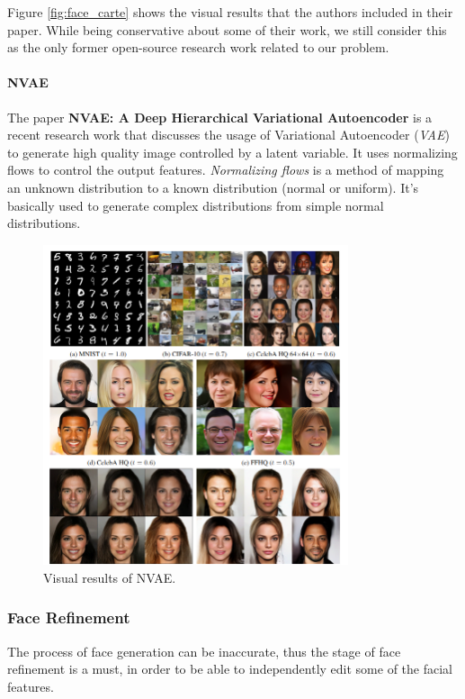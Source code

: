 Figure \ref{fig:face_carte} shows the visual results that the authors included in their paper. While being conservative about some of their work, we still consider this as the only former open-source research work related to our problem.

\paragraph{NVAE}
The paper \textbf{NVAE: A Deep Hierarchical Variational Autoencoder} \cite{vahdat2021nvae} is a recent research work that discusses the usage of Variational Autoencoder (\emph{VAE}) to generate high quality image controlled by a latent variable. It uses normalizing flows to control the output features. \emph{Normalizing flows} is a method of mapping an unknown distribution to a known distribution (normal or uniform). It's basically used to generate complex distributions from simple normal distributions.

\begin{figure}[H]
    \centering
    \includegraphics[width=0.8\textwidth]{images/nvae.png}
    \caption{Visual results of NVAE.}
    \label{fig:nvae}
\end{figure}

\subsubsection{Face Refinement}
The process of face generation can be inaccurate, thus the stage of face refinement is a must, in order to be able to independently edit some of the facial features.

